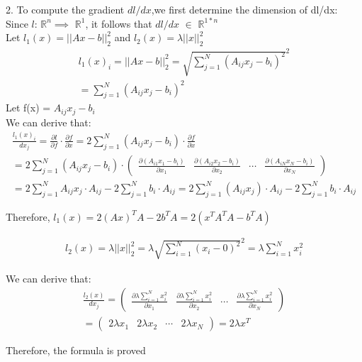 \documentclass{article}
\begin{document}
2. To compute the gradient $dl/dx$,we first determine the dimension of dl/dx: Since $l$: $\mathbb{R}^n \implies$  $\mathbb{R}^1$, it follows that $dl/dx$ $\in$ $\mathbb{R}^{1*n}$\\

Let $l_1(x) = ||Ax-b||^2_2$ and $l_2(x) = \lambda||x||^2_2$
\begin{gather}
 l_{1}(x)_{i} = ||Ax-b||^2_2 = \sqrt{\sum_{j=1}^{N}(A_{ij}x_j - b_i)^2}^2 \\
 = \sum_{j=1}^{N}(A_{ij}x_j - b_i)^2 
\end{gather}
Let f(x) = $A_{ij}x_j - b_i$\\

We can derive that:
\begin{gather}
\frac{l_{1}(x)_{i}}{dx_j} = \frac{\partial l}{\partial f} \cdot  \frac{\partial f}{\partial x} = 2\sum_{j=1}^N (A_{ij}x_j - b_i) \cdot \frac{\partial f}{\partial x} \\ = 2\sum_{j=1}^N (A_{ij}x_j - b_i) \cdot \begin{pmatrix}
\frac{\partial (A_{i1}x_1 - b_i)}{\partial x_1} & \frac{\partial (A_{i2}x_2 - b_i)}{\partial x_2} & \cdots & \frac{\partial (A_{iN}x_N - b_i)}{\partial x_N} \end{pmatrix}  \\= 2 \sum_{j=1}^N  A_{ij}x_j \cdot A_{ij} - 2 \sum_{j=1}^N b_i \cdot A_{ij} = 2 \sum_{j=1}^N  (A_{ij}x_j) \cdot A_{ij} - 2 \sum_{j=1}^N b_i \cdot A_{ij}
\end{gather}

Therefore, $l_1(x) = 2(Ax)^TA-2b^TA = 2(x^TA^TA - b^TA)$

\begin{gather}
l_2(x) = \lambda ||x||^2_2 = \lambda \sqrt{\sum_{i=1}^{N}{(x_i - 0)^2}}^2 = \lambda \sum_{i=1}^{N}{x_i^2}
\end{gather}

We can derive that:
\begin{gather}
\frac{l_2(x)}{dx_j} = \begin{pmatrix}
\frac{\partial \lambda \sum_{i=1}^{N}{x_i^2}}{\partial x_1} & \frac{\partial \lambda \sum_{i=1}^{N}{x_i^2}}{\partial x_2} & \cdots & \frac{\partial \lambda \sum_{i=1}^{N}{x_i^2}}{\partial x_N}
\end{pmatrix} \\ = \begin{pmatrix}
2\lambda x_1 & 2\lambda x_2 & \cdots & 2\lambda x_N 
\end{pmatrix} = 2 \lambda x^T
\end{gather}

Therefore, the formula is proved
\end{document}
